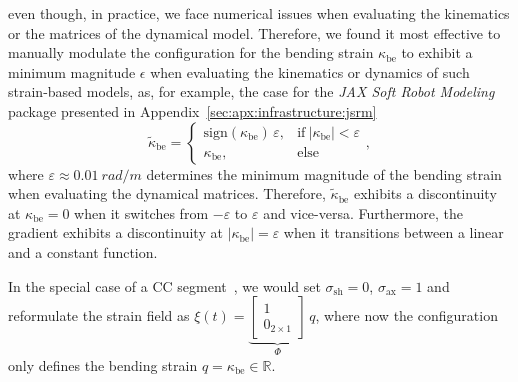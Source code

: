 even though, in practice, we face numerical issues when evaluating the kinematics or the matrices of the dynamical model.
Therefore, we found it most effective to manually modulate the configuration for the bending strain $\kappa_\mathrm{be}$ to exhibit a minimum magnitude $\epsilon$ when evaluating the kinematics or dynamics of such strain-based models, as, for example, the case for the \emph{JAX Soft Robot Modeling} package presented in Appendix~\ref{sec:apx:infrastructure:jsrm}
\begin{equation}
    \tilde{\kappa}_\mathrm{be} = \begin{cases}
        \mathrm{sign}(\kappa_\mathrm{be}) \, \varepsilon, & \text{if} \: |\kappa_\mathrm{be}| < \varepsilon\\
        \kappa_\mathrm{be}, & \text{else}
    \end{cases},
\end{equation}
where $\varepsilon \approx \SI{0.01}{rad \per m}$ determines the minimum magnitude of the bending strain when evaluating the dynamical matrices.
Therefore, $\tilde{\kappa}_\mathrm{be}$ exhibits a discontinuity at $\kappa_\mathrm{be} = 0$ when it switches from $-\varepsilon$ to $\varepsilon$ and vice-versa. Furthermore, the gradient exhibits a discontinuity at $|\kappa_\mathrm{be}| = \varepsilon$ when it transitions between a linear and a constant function.

In the special case of a \gls{CC} segment~\citep{webster2010design, della2023model}, we would set $\sigma_\mathrm{sh} = 0$, $\sigma_\mathrm{ax} = 1$ and reformulate the strain field as $\xi(t) = \underbrace{\begin{bmatrix}
    1\\ 0_{2 \times 1}
\end{bmatrix}}_{\Phi} \, q$, where now the configuration only defines the bending strain $q = \kappa_\mathrm{be} \in \mathbb{R}$.


